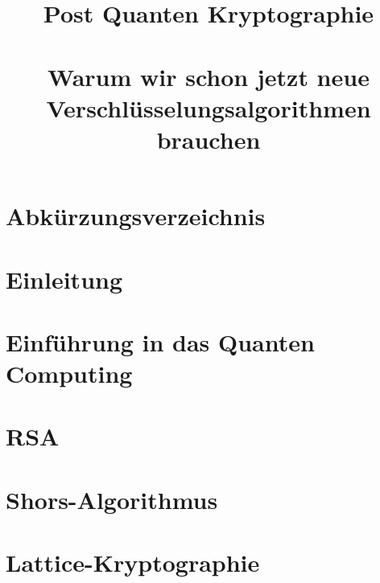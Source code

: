 \documentclass[conference]{IEEEtran}
\begin{document}

\title{Post Quanten Kryptographie\\
\large \ \\ \large Warum wir schon jetzt neue Verschlüsselungsalgorithmen brauchen}

\author{

  \and

}

\maketitle



\listoffigures
{}

\section*{Abkürzungsverzeichnis}


\section{Einleitung}


\section{Einführung in das Quanten Computing}


\section{RSA}


\section{Shors-Algorithmus}


\section{Lattice-Kryptographie}

\end{document}
